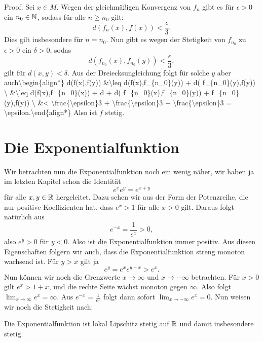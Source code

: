 \begin{emphBox}{}{}
Proof.  Sei \(x \in M\). Wegen der gleichmäßigen Konvergenz von \(f_n\) gibt es für \(\epsilon > 0\) ein \(n_0 \in \mathbb{N}\), sodass für alle \(n \geq n_0\) gilt:
\begin{equation*}
 d(f_n(x),f(x)) < \frac{\epsilon}3.
\end{equation*}
Dies gilt insbesondere für \(n=n_0\). Nun gibt es wegen der Stetigkeit von \(f_{n_0}\) zu \(\epsilon > 0\) ein \(\delta > 0\), sodas
\begin{equation*}
 d(f_{n_0}(x),f_{n_0}(y)) < \frac{\epsilon}3,
\end{equation*}
gilt für \(d(x,y) < \delta\). Aus der Dreiecksungleichung folgt für solche \(y\) aber auch\textbackslash{}begin\{align*\} d(f(x),f(y)) \&\textbackslash{}leq d(f(x),f\_\{n\_0\}(y)) + d( f\_\{n\_0\}(y),f(y)) \textbackslash{} \&\textbackslash{}leq d(f(x),f\_\{n\_0\}(x)) + d + d( f\_\{n\_0\}(x),f\_\{n\_0\}(y)) + f\_\{n\_0\}(y),f(y)) \textbackslash{} \&< \textbackslash{}frac\{\textbackslash{}epsilon\}3 + \textbackslash{}frac\{\textbackslash{}epsilon\}3 + \textbackslash{}frac\{\textbackslash{}epsilon\}3 = \textbackslash{}epsilon.\textbackslash{}end\{align*\}
Also ist \(f\) stetig.
\end{emphBox}


\section{Die Exponentialfunktion}
\label{\detokenize{stetigkeit/exp:die-exponentialfunktion}}\label{\detokenize{stetigkeit/exp::doc}}
Wir betrachten nun die Exponentialfunktion noch ein wenig näher, wir haben ja im letzten Kapitel schon die Identität
\begin{equation*}
 e^x e^y = e^{x+y}
\end{equation*}
für alle \(x,y \in \mathbb{R}\) hergeleitet. Dazu sehen wir aus der Form der Potenzreihe, die nur positive Koeffizienten hat, dass \(e^x > 1\) für alle \(x > 0\) gilt. Daraus folgt natürlich aus
\begin{equation*}
 e^{-x} = \frac{1}{e^x} > 0,
\end{equation*}
also \(e^y > 0\) für \(y < 0\). Also ist die Exponentialfunktion immer positiv.
Aus diesen Eigenschaften folgern wir auch, dass die Exponentialfunktion streng monoton wachsend ist. Für \(y > x\) gilt ja
\begin{equation*}
 e^y = e^x e^{y-x} > e^x.
\end{equation*}
Nun können wir noch die Grenzwerte \(x \rightarrow \infty\) und \(x \rightarrow - \infty\) betrachten. Für \(x > 0\) gilt \(
e^x > 1+x\), und die rechte Seite wächst monoton gegen \(\infty\). Also folgt \(\lim_{x \rightarrow \infty} e^x = \infty. \) Aus \(e^{-x} = \frac{1}{e^x} \) folgt dann sofort \(\lim_{x \rightarrow - \infty} e^x = 0. \)
Nun weisen wir noch die Stetigkeit nach:
\label{stetigkeit/exp:theorem-0}
\begin{theorem}{}{}



Die Exponentialfunktion ist lokal Lipschitz stetig auf \(\mathbb{R}\) und damit insbesondere stetig.
\end{theorem}

